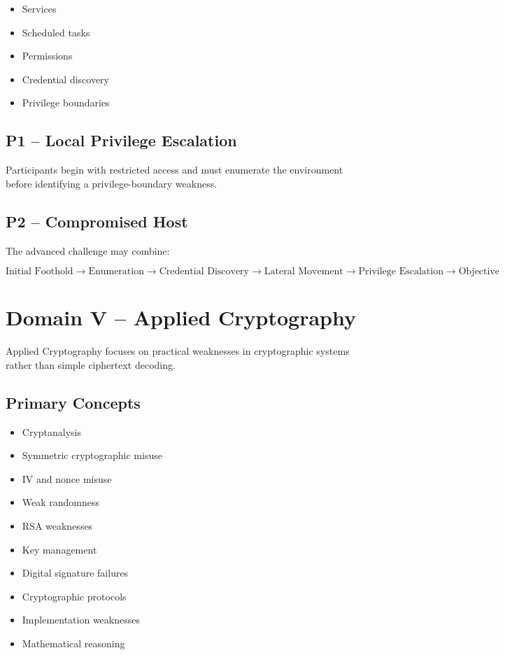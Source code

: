 \documentclass[11pt,a4paper]{article}
\begin{document}
\begin{itemize}

    \item Services
    \item Scheduled tasks
    \item Permissions
    \item Credential discovery
    \item Privilege boundaries

\end{itemize}


\subsection{P1 -- Local Privilege Escalation}

Participants begin with restricted access and must enumerate the
environment before identifying a privilege-boundary weakness.


\subsection{P2 -- Compromised Host}

The advanced challenge may combine:

\[
\text{Initial Foothold}
\rightarrow
\text{Enumeration}
\rightarrow
\text{Credential Discovery}
\rightarrow
\text{Lateral Movement}
\rightarrow
\text{Privilege Escalation}
\rightarrow
\text{Objective}
\]



\section{Domain V -- Applied Cryptography}

Applied Cryptography focuses on practical weaknesses in cryptographic
systems rather than simple ciphertext decoding.


\subsection{Primary Concepts}

\begin{itemize}

    \item Cryptanalysis
    \item Symmetric cryptographic misuse
    \item IV and nonce misuse
    \item Weak randomness
    \item RSA weaknesses
    \item Key management
    \item Digital signature failures
    \item Cryptographic protocols
    \item Implementation weaknesses
    \item Mathematical reasoning

\end{itemize}
\end{document}
